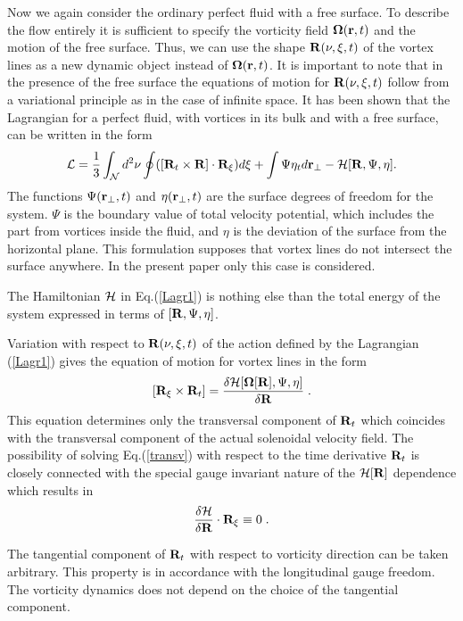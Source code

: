 Now we again consider the ordinary perfect fluid with a free surface.
To describe the flow entirely it is sufficient to
specify the vorticity field ${\bf \Omega }({\bf r},t)$ and the motion of
the free surface. Thus, we can use the shape 
${\bf R}(\nu,\xi,t)$ of the vortex lines as a new dynamic object instead of 
${\bf \Omega }({\bf r},t)$. It is important to note 
that in the presence of the free surface the equations of motion 
for ${\bf R}(\nu,\xi,t)$ follow from a variational principle
as in the case of infinite space. It has been shown 
\cite{KR99} that the Lagrangian for a perfect fluid, with vortices in its bulk 
and with a free surface, can be written in the form
\begin{equation}\label{Lagr1}
{\cal L}=\frac{1}{3} \int_{\cal N} d^2\nu 
\oint([{\bf R}_t\times{\bf R}]\cdot{\bf R}_{\xi})d\xi+
\int \Psi \eta_t d{\bf r}_{\bot} -{\cal H}[{\bf R},\Psi,\eta].
\end{equation}
The functions $\Psi({\bf r}_{\bot},t)$ and $\eta({\bf r}_{\bot},t)$
are the surface degrees of freedom for the system. $\Psi$ is the boundary
value of total velocity potential, which includes the part from vortices 
inside the fluid, 
and $\eta$ is the deviation of the surface from the horizontal plane.
This formulation supposes that vortex lines do not intersect the 
surface anywhere. In the present paper only this case is considered.

The Hamiltonian ${\cal H}$ in Eq.(\ref{Lagr1}) 
is nothing else than the total energy of the 
system expressed in terms of $[{\bf R},\Psi,\eta]$.

Variation with respect to 
${\bf R}(\nu,\xi,t)$ of the action defined by the Lagrangian (\ref{Lagr1}) 
gives the equation of motion for vortex lines in the form
\begin{equation}\label{transv}
[{\bf R}_\xi\times{\bf R}_t]=\frac{\delta{\cal H}[{\bf\Omega[R]},\Psi,\eta]}
{\delta{\bf R}} \; .
\end{equation}
This equation determines only the transversal component of ${\bf R}_t$
which coincides with the transversal component of the actual solenoidal 
velocity field. The possibility of solving Eq.(\ref{transv}) 
with respect to the time derivative ${\bf R}_t$ is closely connected with the 
special gauge invariant nature of the ${\cal H}[{\bf R}]$ dependence which results in 
$$
\frac{\delta{\cal H}}
{\delta{\bf R}}\cdot {\bf R}_\xi \equiv 0 \; .
$$ 

The tangential component of ${\bf R}_t$ with respect to vorticity direction 
can be taken arbitrary. 
This property is in accordance with the longitudinal gauge 
freedom. The vorticity dynamics does not depend on the choice of the 
tangential component. 

